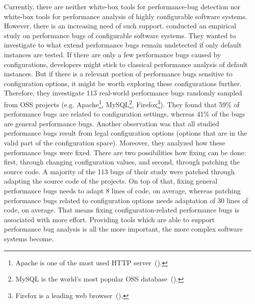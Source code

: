 


Currently, there are neither white-box tools for performance-bug detection nor white-box tools for performance analysis of highly configurable software systems. However, there is an increasing need of such support. 
\cite{Han:2016:ESP:2961111.2962602} conducted an empirical study on performance bugs of configurable software systems. They wanted to investigate to what extend performance bugs remain undetected if only default instances are tested. If there are only a few performance bugs caused by configurations, developers might stick to classical performance analysis of default instances. But if there is a relevant portion of performance bugs sensitive to configuration options, it might be worth exploring these configurations further. Therefore, they investigate 113 real-world performance bugs randomly sampled from \ac{OSS} projects (e.g. Apache\footnote{Apache is one of the most used HTTP server~(\cite{apache2018url}).}, MySQL\footnote{MySQL is the world's most popular \ac{OSS} database~(\cite{mysql2018url}).}, Firefox\footnote{Firefox is a leading web browser~(\cite{firefox2018url}).}). They found that 59\% of performance bugs are related to configuration settings, whereas 41\% of the bugs are general performance bugs. Another observation was that all studied performance bugs result from legal configuration options (options that are in the valid part of the configuration space). Moreover, they analyzed how these performance bugs were fixed. There are two possibilities how fixing can be done: first, through changing configuration values, and second, through patching the source code. A majority of the 113 bugs of their study were patched through adapting the source code of the projects. On top of that, fixing general performance bugs needs to adapt 8 lines of code, on average, whereas patching performance bugs related to configuration options needs adaptation of 30 lines of code, on average. That means fixing configuration-related performance bugs is associated with more effort. Providing tools which are able to support performance bug analysis is all the more important, the more complex software systems become.


